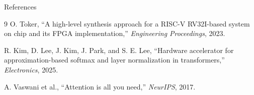 \documentclass[aspectratio=169]{beamer}
\begin{document}
\begin{frame}{References}
\footnotesize
\begin{thebibliography}{9}
O. Toker, ``A high-level synthesis approach for a RISC-V RV32I-based system on chip and its FPGA implementation,'' \emph{Engineering Proceedings}, 2023.

R. Kim, D. Lee, J. Kim, J. Park, and S. E. Lee, ``Hardware accelerator for approximation-based softmax and layer normalization in transformers,'' \emph{Electronics}, 2025.

A. Vaswani et al., ``Attention is all you need,'' \emph{NeurIPS}, 2017.
\end{thebibliography}
\end{frame}
\end{document}
